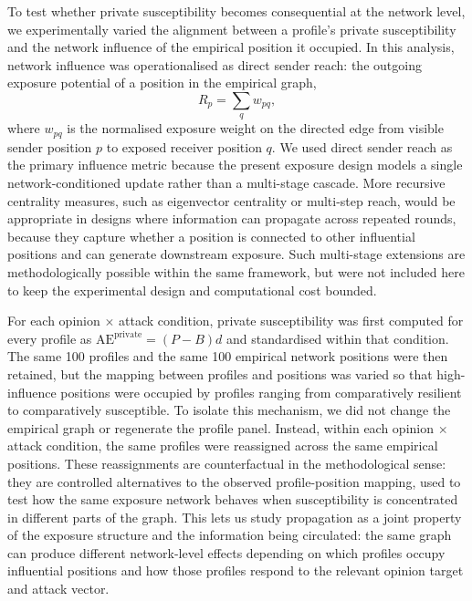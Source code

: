 \documentclass[11pt,a4paper]{article}
\begin{document}
To test whether private susceptibility becomes consequential at the network level, we
experimentally varied the alignment between a profile's private susceptibility and the network
influence of the empirical position it occupied. In this analysis, network influence was
operationalised as direct sender reach: the outgoing exposure potential of a position in the
empirical graph,
\begin{equation}
R_p = \sum_q w_{pq},
\end{equation}
where $w_{pq}$ is the normalised exposure weight on the directed edge from visible sender position
$p$ to exposed receiver position $q$. We used direct sender reach as the primary influence metric
because the present exposure design models a single network-conditioned update rather than a
multi-stage cascade. More recursive centrality measures, such as eigenvector centrality or
multi-step reach, would be appropriate in designs where information can propagate across repeated
rounds, because they capture whether a position is connected to other influential positions and
can generate downstream exposure. Such multi-stage extensions are methodologically possible within
the same framework, but were not included here to keep the experimental design and computational
cost bounded.

For each opinion $\times$ attack condition, private susceptibility was first computed for every
profile as \(\mathrm{AE}^{\mathrm{private}} = (P-B)d\) and standardised within that condition. The
same 100 profiles and the same 100 empirical network positions were then retained, but the mapping
between profiles and positions was varied so that high-influence positions were occupied by
profiles ranging from comparatively resilient to comparatively susceptible. To isolate this
mechanism, we did not change the empirical graph or regenerate the profile panel. Instead, within
each opinion $\times$ attack condition, the same profiles were reassigned across the same empirical
positions. These reassignments are counterfactual in the methodological sense: they are controlled
alternatives to the observed profile-position mapping, used to test how the same exposure network
behaves when susceptibility is concentrated in different parts of the graph. This lets us study
propagation as a joint property of the exposure structure and the information being circulated:
the same graph can produce different network-level effects depending on which profiles occupy
influential positions and how those profiles respond to the relevant opinion target and attack
vector.
\end{document}
